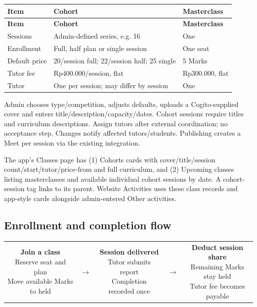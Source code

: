 \documentclass[11pt,a4paper]{article}
\newcommand{\flowbox}[2]{\fbox{\parbox[c]{#1}{\centering\small #2}}}
\begin{document}
{\small
\begin{longtable}{|L{28.54mm}|L{52.57mm}|L{69.09mm}|}
\hline
\textbf{Item} & \textbf{Cohort} & \textbf{Masterclass} \\ \hline
\endfirsthead
\hline
\textbf{Item} & \textbf{Cohort} & \textbf{Masterclass} \\ \hline
\endhead
Sessions & Admin-defined series, e.g. 16 & One \\ \hline
Enrollment & Full, half plan or single session & One seat \\ \hline
Default price & 20/\allowbreak{}session full; 22/\allowbreak{}session half; 25 single & 5 Marks \\ \hline
Tutor fee & Rp400.000/\allowbreak{}session, flat & Rp300.000, flat \\ \hline
Tutor & One per session; may differ by session & One \\ \hline
\end{longtable}
}

Admin chooses type/\allowbreak{}competition, adjusts defaults, uploads a Cogito-supplied cover and enters title/\allowbreak{}description/\allowbreak{}capacity/\allowbreak{}dates. Cohort sessions require titles and curriculum descriptions. Assign tutors after external coordination; no acceptance step. Changes notify affected tutors/\allowbreak{}students. Publishing creates a Meet per session via the existing integration.

The app's Classes page has (1) Cohorts cards with cover/\allowbreak{}title/\allowbreak{}session count/\allowbreak{}start/\allowbreak{}tutor/\allowbreak{}price-from and full curriculum, and (2) Upcoming classes listing masterclasses and available individual cohort sessions by date. A cohort-session tag links to its parent. Website Activities uses these class records and app-style cards alongside admin-entered Other activities.

\subsection*{Enrollment and completion flow}

\begin{center}
\begin{tabular}{@{}c@{\;}c@{\;}c@{\;}c@{\;}c@{}}
\flowbox{43mm}{\textbf{Join a class}\\Reserve seat and plan\\Move available Marks to held} & $\rightarrow$ & \flowbox{43mm}{\textbf{Session delivered}\\Tutor submits report\\Completion recorded once} & $\rightarrow$ & \flowbox{43mm}{\textbf{Deduct session share}\\Remaining Marks stay held\\Tutor fee becomes payable} \\
\end{tabular}
\end{center}
\end{document}
